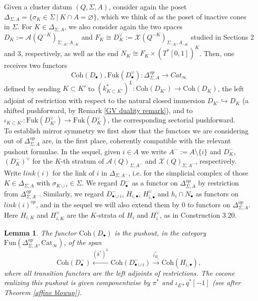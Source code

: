 \documentclass[11pt]{amsart}
\newtheorem{lem}[thm]{Lemma}
\theoremstyle{definition}
\theoremstyle{remark}
\newcommand{\Coh}{\mathrm{Coh}}
\newcommand{\Fuk}{\mathrm{Fuk}}
\renewcommand{\emptyset}{\varnothing}
\numberwithin{equation}{section}
\begin{document}
Given a cluster datum $(Q, \Sigma, A)$, consider again the poset $\Delta_{\Sigma, A} = \{\sigma_K \in \Sigma \:|\: K \cap A = \emptyset\}$, which we think of as the poset of inactive cones in $\Sigma$. For $K \in \Delta_{\Sigma, A}$, we also consider again the two spaces $D_K := \mathcal{A}(Q^{-K})_{\Sigma_{-K}, A_{-K}}$ and $F_K \cong D_K^\vee := \mathcal{X}(Q^{-K})_{\Sigma_{-K}, A_{-K}}$ studied in Sections 2 and 3, respectively, as well as the end $N_K \cong F_K \times (T^*[0,1])^K$. Then, one receives two functors $$\Coh(D_\bullet), \Fuk(D_\bullet^\vee): \Delta_{\Sigma, A}^{op} \rightarrow Cat_\infty$$ \noindent defined by sending $K \subset K'$ to $(k^*_{K\subset K'})^L: \Coh(D_{K'}) \rightarrow \Coh(D_K)$, the left adjoint of restriction with respect to the natural closed immersion $D_{K'} \hookrightarrow D_K$ (a shifted pushforward, by Remark \ref{GV duality remark}), and to $\iota_{K \subset K'}: \Fuk(D_{K'}^\vee) \rightarrow \Fuk(D_K^\vee)$, the corresponding sectorial pushforward.\\

To establish mirror symmetry we first show that the functors we are considering out of $\Delta_{\Sigma, A}^{op}$ are, in the first place, coherently compatible with the relevant pushout formulae. In the sequel, given $i\in A$ we write $A^-:=A\setminus\{i\}$ and $D^-_K$, $(D_K^-)^
\vee$ for the $K$-th stratum of $\mathcal{A}(Q)_{\Sigma,A^-}$ and  $\mathcal{X}(Q)_{\Sigma,A^-}$, respectively. Write $link(i)$ for the link of $i$ in $\Delta_{\Sigma,A^-}$, i.e. for the simplicial complex of those $K\in\Delta_{\Sigma,A}$ with $\sigma_{K\cup i}\in\Sigma$. We regard $D^-_\bullet$ as a functor on $\Delta_{\Sigma,A}^{op}$ by restriction from $\Delta_{\Sigma,A^-}^{op}$. Similarly, we regard $D^-_{\bullet\cup i}$, $H_{i,\bullet}$, $H^\vee_{i,\bullet}$ and $h_i\cap N_\bullet$ as functors on $link(i)^{op}$, and in the sequel we will also extend them by $0$ to functors on $\Delta_{\Sigma,A}^{op}$. Here $H_{i,K}$ and $H^\vee_{i,K}$ are the $K$-strata of $H_i$ and $H_i^\vee$, as in Construction 3.20.

\begin{lem}\label{lem:Bglue}
The functor $\Coh(D_\bullet)$ is the pushout, in the category $\mathrm{Fun}(\Delta^{op}_{\Sigma,A},\mathrm{Cat}_\infty)$, of the span
 $$
\Coh(D^-_\bullet)\xleftarrow{(k^*)^L}\Coh(D^-_{\bullet\cup i})\xrightarrow{i^*_{H_i}}\Coh(H_{i,\bullet}),$$
where all transition functors are the left adjoints of restrictions. The cocone realizing this pushout is given componentwise by $\pi^*$ and $\iota_{E*}q^*[-1]$ (see after Theorem \ref{affine blowup}).
\end{lem}
 
\end{document}
